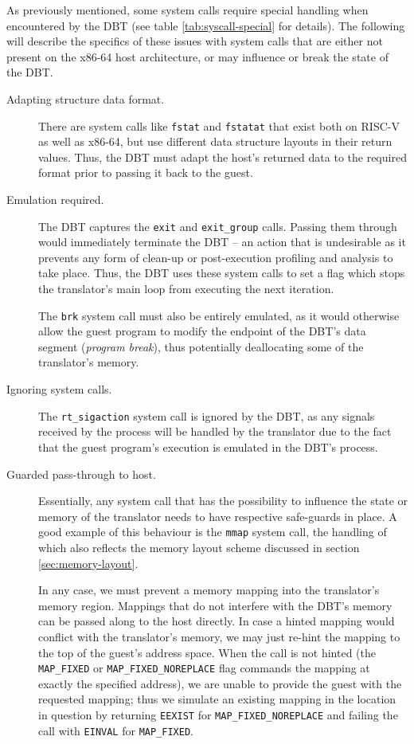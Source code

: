 As previously mentioned, some system calls require special handling when encountered by the DBT (see table \vref{tab:syscall-special} for details).
The following will describe the specifics of these issues with system calls that are either not present on the x86-64 host architecture, or may influence or break the state of the DBT.
\begin{description}
	\item[Adapting structure data format.]
	There are system calls like \texttt{fstat} and \texttt{fstatat} that exist both on RISC-V as well as x86-64, but use different data structure layouts in their return values.
	Thus, the DBT must adapt the host's returned data to the required format prior to passing it back to the guest.
	
	
	\item[Emulation required.]
	The DBT captures the \texttt{exit} and \texttt{exit\_group} calls.
	Passing them through would immediately terminate the DBT -- an action that is undesirable as it prevents any form of clean-up or post-execution profiling and analysis to take place.
	Thus, the DBT uses these system calls to set a flag which stops the translator's main loop from executing the next iteration.
	
	The \texttt{brk} system call must also be entirely emulated, as it would otherwise allow the guest program to modify the endpoint of the DBT's data segment (\textit{program break}), thus potentially deallocating some of the translator's memory.
	
	
	\item[Ignoring system calls.]
	The \texttt{rt\_sigaction} system call is ignored by the DBT, as any signals received by the process will be handled by the translator due to the fact that the guest program's execution is emulated in the DBT's process.
	
	
	\item[Guarded pass-through to host.]
	Essentially, any system call that has the possibility to influence the state or memory of the translator needs to have respective safe-guards in place.
	A good example of this behaviour is the \texttt{mmap} system call, the handling of which also reflects the memory layout scheme discussed in section \vref{sec:memory-layout}.
	
	In any case, we must prevent a memory mapping into the translator's memory region.
	Mappings that do not interfere with the DBT's memory can be passed along to the host directly.
	In case a hinted mapping would conflict with the translator's memory, we may just re-hint the mapping to the top of the guest's address space.
	When the call is not hinted (the \texttt{MAP\_FIXED} or \texttt{MAP\_FIXED\_NOREPLACE} flag commands the mapping at exactly the specified address), we are unable to provide the guest with the requested mapping; thus we simulate an existing mapping in the location in question by returning \texttt{EEXIST} for \texttt{MAP\_FIXED\_NOREPLACE} and failing the call with \texttt{EINVAL} for \texttt{MAP\_FIXED}.
	

\end{description}

